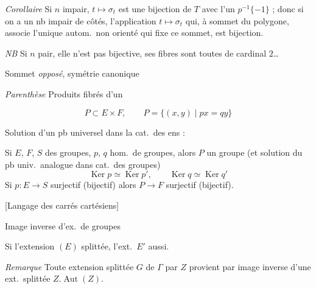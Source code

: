 \documentclass[11pt,a4paper]{article}
\begin{document}
\emph{Corollaire} Si $n$ impair, $t \mapsto \sigma_t$ est une bijection
de $T$ avec l'un  $p^{-1}\{-1\}$ ; donc si on a un nb impair de
côtés, l'application $t \mapsto \sigma_t$ qui, à  sommet du
polygone, associe l'unique autom.\ non orienté qui fixe ce sommet, est
bijection.

\emph{NB} Si $n$ pair, elle n'est pas bijective,  ses
fibres sont toutes de cardinal $2$…

\struck{\ill{}} Sommet \emph{opposé}, symétrie canonique


\emph{Parenthèse} Produits fibrés d'un

\[
  P \subset E \times F, \qquad P = \{ (x, y) \mid px = qy \}
\]

Solution d'un pb universel dans la cat.\ des ens :

Si $E$, $F$, $S$ des groupes, $p$, $q$ hom.\ de groupes, alors $P$ un groupe
(et solution du pb univ.\ analogue dans cat.\ des groupes)
\[
  \operatorname{Ker} p \simeq \operatorname{Ker} p', \qquad
  \operatorname{Ker} q \simeq \operatorname{Ker} q'
\]
Si $p : E \to S$ surjectif (bijectif) alors $P \to F$ surjectif (bijectif).

[Langage des  carrés cartésiens]

Image inverse d'ex.\ de groupes


Si l'extension $(E)$ splittée, l'ext.\ $E'$ aussi.

\emph{Remarque} Toute extension splittée $G$ de $\Gamma$ par $Z$ provient
par image inverse d'une ext.\ splittée $Z.\operatorname{Aut}(Z)$.
\end{document}
